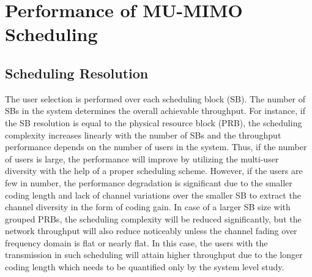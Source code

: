 \documentclass[conference,letterpaper]{./../../IEEE/IEEEtran}
\begin{document}
\section{Performance of MU-MIMO Scheduling}
\label{sec:perf_scheduling}
\subsection{Scheduling Resolution}
The user selection is performed over each scheduling block (SB). The number of SBs in the system determines the overall achievable throughput. For instance, if the SB resolution is equal to the physical resource block (PRB), the scheduling complexity increases linearly with the number of SBs and the throughput performance depends on the number of users in the system. Thus, if the number of users is large, the performance will improve by utilizing the multi-user diversity with the help of a proper scheduling scheme. However, if the users are few in number, the performance degradation is significant due to the smaller coding length and lack of channel variations over the smaller SB to extract the channel diversity in the form of coding gain. In case of a larger SB size with grouped PRBs, the scheduling complexity will be reduced significantly, but the network throughput will also reduce noticeably unless the channel fading over frequency domain is flat or nearly flat. In this case, the users with the transmission in such scheduling will attain higher throughput due to the longer coding length which needs to be quantified only by the system level study.
\end{document}
